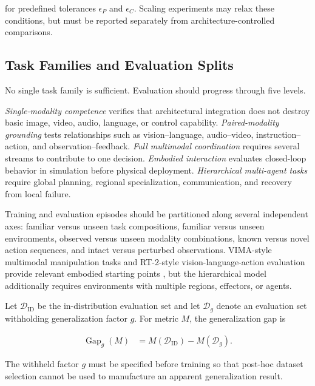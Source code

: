 for predefined tolerances $\epsilon_P$ and $\epsilon_C$. Scaling experiments may relax these conditions, but must be reported separately from architecture-controlled comparisons.

\subsection{\textbf{Task Families and Evaluation Splits}}

No single task family is sufficient. Evaluation should progress through five levels.

\textit{Single-modality competence} verifies that architectural integration does not destroy basic image, video, audio, language, or control capability. \textit{Paired-modality grounding} tests relationships such as vision--language, audio--video, instruction--action, and observation--feedback. \textit{Full multimodal coordination} requires several streams to contribute to one decision. \textit{Embodied interaction} evaluates closed-loop behavior in simulation before physical deployment. \textit{Hierarchical multi-agent tasks} require global planning, regional specialization, communication, and recovery from local failure.

Training and evaluation episodes should be partitioned along several independent axes: familiar versus unseen task compositions, familiar versus unseen environments, observed versus unseen modality combinations, known versus novel action sequences, and intact versus perturbed observations. VIMA-style multimodal manipulation tasks and RT-2-style vision-language-action evaluation provide relevant embodied starting points \cite{jiang2023vima,zitkovich2023rt2}, but the hierarchical model additionally requires environments with multiple regions, effectors, or agents.

Let $\mathcal{D}_{\mathrm{ID}}$ be the in-distribution evaluation set and let $\mathcal{D}_{g}$ denote an evaluation set withholding generalization factor $g$. For metric $M$, the generalization gap is

\begin{equation}
\begin{aligned}
    \operatorname{Gap}_{g}(M)
    &= M\!\left(\mathcal{D}_{\mathrm{ID}}\right)
       -M\!\left(\mathcal{D}_{g}\right).
\end{aligned}
\label{eq:generalization_gap}
\end{equation}

The withheld factor $g$ must be specified before training so that post-hoc dataset selection cannot be used to manufacture an apparent generalization result.

